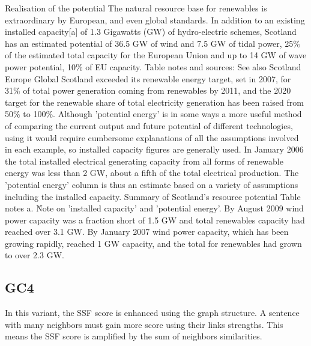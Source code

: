 \begin{tcolorbox}\footnotesize
	Realisation of the potential The natural resource base for renewables is extraordinary by European, and even global standards.
	In addition to an existing installed capacity[a] of 1.3 Gigawatts (GW) of hydro-electric schemes, Scotland has an estimated potential of 36.5 GW of wind and 7.5 GW of tidal power, 25\% of the estimated total capacity for the European Union and up to 14 GW of wave power potential, 10\% of EU capacity.
	Table notes and sources: See also Scotland Europe Global
	Scotland exceeded its renewable energy target, set in 2007, for 31\% of total power generation coming from renewables by 2011, and the 2020 target for the renewable share of total electricity generation has been raised from 50\% to 100\%.
	Although 'potential energy' is in some ways a more useful method of comparing the current output and future potential of different technologies, using it would require cumbersome explanations of all the assumptions involved in each example, so installed capacity figures are generally used.
	In January 2006 the total installed electrical generating capacity from all forms of renewable energy was less than 2 GW, about a fifth of the total electrical production.
	The 'potential energy' column is thus an estimate based on a variety of assumptions including the installed capacity.
	Summary of Scotland's resource potential Table notes a. \^ Note on 'installed capacity' and 'potential energy'.
	By August 2009 wind power capacity was a fraction short of 1.5 GW and total renewables capacity had reached over 3.1 GW.
	By January 2007 wind power capacity, which has been growing rapidly, reached 1 GW capacity, and the total for renewables had grown to over 2.3 GW.
\end{tcolorbox}

\subsection{GC4}

In this variant, the SSF score is enhanced using the graph structure. 
A sentence with many neighbors must gain more score using their links strengths.
This means the SSF score is amplified by the sum of neighbors similarities.

